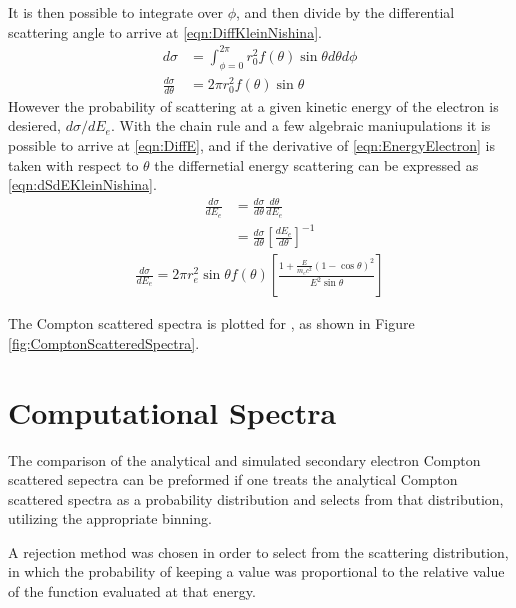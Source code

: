 It is then possible to integrate over $\phi$, and then divide by the differential scattering angle to arrive at \eqref{eqn:DiffKleinNishina}.
\begin{align}
  \label{eqn:DiffKleinNishina}
  d\sigma &=\int_{\phi=0}^{2\pi} r_0^2 f(\theta)\sin\theta d\theta d\phi\\
  \frac{d\sigma}{d\theta} &=2\pi r_0^2 f(\theta)\sin\theta
\end{align}
However the probability of scattering at a given kinetic energy of the electron is desiered, $d\sigma/dE_e$.
With the chain rule and a few algebraic maniupulations it is possible to arrive at \eqref{eqn:DiffE}, and if the derivative of \eqref{eqn:EnergyElectron} is taken with respect to $\theta$ the differnetial energy scattering can be expressed as \eqref{eqn:dSdEKleinNishina}.
\begin{align}
  \label{eqn:DiffE}
  \frac{d\sigma}{dE_e} & = \frac{d\sigma}{d\theta} \frac{d\theta}{dE_e} \\
   & = \frac{d\sigma}{d\theta} \left[\frac{dE_e}{d\theta}\right]^{-1} 
\end{align}
\begin{align}
  \label{eqn:dSdEKleinNishina}
\frac{d\sigma}{dE_e} = 2\pi r_e^2 \sin \theta f(\theta)\left [ \frac{1+\frac{E}{m_e c^2}\left(1-\cos\theta \right)^2}{E^2 \sin \theta} \right ]
\end{align}

The Compton scattered spectra is plotted for , as shown in Figure \ref{fig:ComptonScatteredSpectra}.

\section{Computational Spectra}
The comparison of the analytical and simulated secondary electron Compton scattered sepectra can be preformed if one treats the analytical Compton scattered spectra as a probability distribution and selects from that distribution, utilizing the appropriate binning.

A rejection method was chosen in order to select from the scattering distribution, in which the probability of keeping a value was proportional to the relative value of the function evaluated at that energy.

